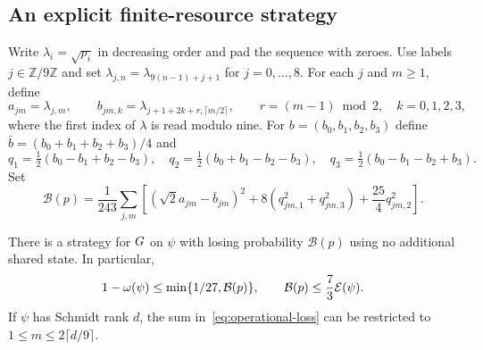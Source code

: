 
\subsection{An explicit finite-resource strategy}\label{sec:operational-strategy}

Write $\lambda_i=\sqrt{p_i}$ in decreasing order and pad the sequence with zeroes. Use labels $j\in\mathbb Z/9\mathbb Z$ and set $\lambda_{j,n}=\lambda_{9(n-1)+j+1}$ for $j=0,\ldots,8$. For each $j$ and $m\ge1$, define
\[
 a_{jm}=\lambda_{j,m},\qquad
 b_{jm,k}=\lambda_{j+1+2k+r,\lceil m/2\rceil},\qquad
 r=(m-1)\bmod 2,\quad k=0,1,2,3,
\]
where the first index of $\lambda$ is read modulo nine. For $b=(b_0,b_1,b_2,b_3)$ define $\bar b=(b_0+b_1+b_2+b_3)/4$ and
\[
 q_1=\tfrac12(b_0-b_1+b_2-b_3),\quad
 q_2=\tfrac12(b_0+b_1-b_2-b_3),\quad
 q_3=\tfrac12(b_0-b_1-b_2+b_3).
\]
Set
\begin{equation}\label{eq:operational-loss}
 \mathcal B(p)=\frac1{243}\sum_{j,m}
 \left[(\sqrt2 a_{jm}-\bar b_{jm})^2
       +8(q_{jm,1}^2+q_{jm,3}^2)+\frac{25}{4}q_{jm,2}^2\right].
\end{equation}

\begin{theorem}\label{thm:operational-upper}
There is a strategy for $G$ on $\psi$ with losing probability $\mathcal B(p)$ using no additional shared state. In particular,
\[
 1-\omega(\psi)\le \min\{1/27,\mathcal B(p)\},\qquad
 \mathcal B(p)\le \frac73\mathcal{E}(\psi).
\]
If $\psi$ has Schmidt rank $d$, the sum in~\eqref{eq:operational-loss} can be restricted to $1\le m\le2\lceil d/9\rceil$.
\end{theorem}

